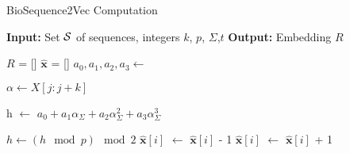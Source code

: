 \documentclass[runningheads]{llncs}
\newcommand{\vect}[1]{\mathbf{#1}}
\begin{document}
\begin{algorithm}[h!]
	\caption{BioSequence2Vec Computation}
    \label{algo_BioSequence2Vec}
	\begin{algorithmic}[1]
 
	\State \textbf{Input:} Set ${\cal S}$ of sequences, integers $k$, $p$, $\Sigma$,$t$
	\State \textbf{Output:} Embedding $R$

        \State $R$ = []
         
            \State $\vect{\hat{x}}$ = [] 
             
                \State $a_0,a_1,a_2,a_3 \gets$ \\ 
                
                \State $ \alpha \gets X[j:j+k]$  
                    
    
                    \State h $\gets$ $a_0 + a_1 \alpha_{\Sigma} + a_2 \alpha_{\Sigma}^2 + a_3 \alpha_{\Sigma}^3$\\ 
                    
                    \State $h \gets (h \mod p) \mod 2$  
                        \State $\vect{\hat{x}}[i]$ $\gets$ $\vect{\hat{x}}[i]$ - 1 
                    \Else
                        \State $\vect{\hat{x}}[i]$ $\gets$ $\vect{\hat{x}}[i]$ + 1 
                    \EndIf
                    

\end{algorithmic}
\end{algorithm}
\end{document}
